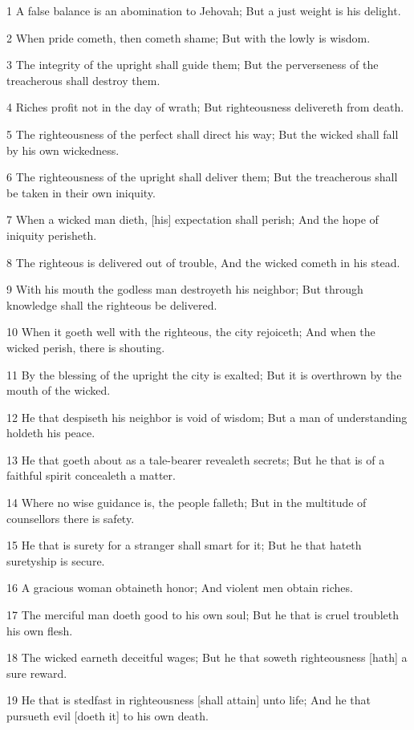 \par 1 A false balance is an abomination to Jehovah; But a just weight is his delight.
\par 2 When pride cometh, then cometh shame; But with the lowly is wisdom.
\par 3 The integrity of the upright shall guide them; But the perverseness of the treacherous shall destroy them.
\par 4 Riches profit not in the day of wrath; But righteousness delivereth from death.
\par 5 The righteousness of the perfect shall direct his way; But the wicked shall fall by his own wickedness.
\par 6 The righteousness of the upright shall deliver them; But the treacherous shall be taken in their own iniquity.
\par 7 When a wicked man dieth, [his] expectation shall perish; And the hope of iniquity perisheth.
\par 8 The righteous is delivered out of trouble, And the wicked cometh in his stead.
\par 9 With his mouth the godless man destroyeth his neighbor; But through knowledge shall the righteous be delivered.
\par 10 When it goeth well with the righteous, the city rejoiceth; And when the wicked perish, there is shouting.
\par 11 By the blessing of the upright the city is exalted; But it is overthrown by the mouth of the wicked.
\par 12 He that despiseth his neighbor is void of wisdom; But a man of understanding holdeth his peace.
\par 13 He that goeth about as a tale-bearer revealeth secrets; But he that is of a faithful spirit concealeth a matter.
\par 14 Where no wise guidance is, the people falleth; But in the multitude of counsellors there is safety.
\par 15 He that is surety for a stranger shall smart for it; But he that hateth suretyship is secure.
\par 16 A gracious woman obtaineth honor; And violent men obtain riches.
\par 17 The merciful man doeth good to his own soul; But he that is cruel troubleth his own flesh.
\par 18 The wicked earneth deceitful wages; But he that soweth righteousness [hath] a sure reward.
\par 19 He that is stedfast in righteousness [shall attain] unto life; And he that pursueth evil [doeth it] to his own death.
